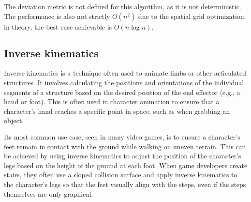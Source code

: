 The deviation metric is not defined for this algorithm, as it is not deterministic. The performance is also not strictly \(O(n^2)\) due to the spatial grid optimization; in theory, the best case achievable is \(O(n \log n)\).

\subsection{Inverse kinematics}
\label{subsec:inverse-forward-kinematics}

Inverse kinematics is a technique often used to animate limbs or other articulated structures. It involves calculating the positions and orientations of the individual segments of a structure based on the desired position of the end effector (e.g., a hand or foot). This is often used in character animation to ensure that a character's hand reaches a specific point in space, such as when grabbing an object.

Its most common use case, seen in many video games, is to ensure a character's feet remain in contact with the ground while walking on uneven terrain. This can be achieved by using inverse kinematics to adjust the position of the character's legs based on the height of the ground at each foot. When game developers create stairs, they often use a sloped collision surface and apply inverse kinematics to the character's legs so that the feet visually align with the steps, even if the steps themselves are only graphical.

